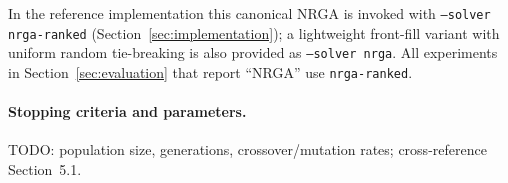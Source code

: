 In the reference implementation this canonical NRGA is invoked with
\texttt{--solver nrga-ranked} (Section~\ref{sec:implementation}); a lightweight
front-fill variant with uniform random tie-breaking is also provided as
\texttt{--solver nrga}. All experiments in Section~\ref{sec:evaluation} that
report ``NRGA'' use \texttt{nrga-ranked}.

\paragraph{Stopping criteria and parameters.} TODO: population size,
generations, crossover/mutation rates; cross-reference Section~5.1.
